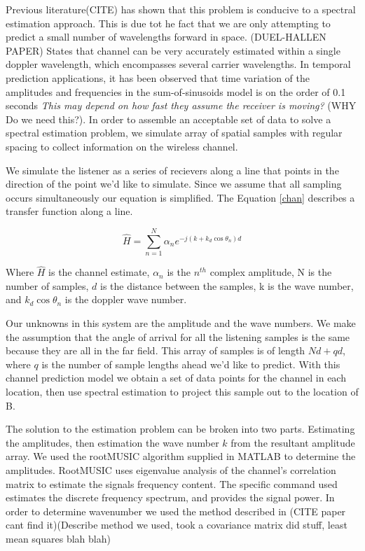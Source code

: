\documentclass{allertonproc}
\begin{document}
Previous literature(CITE) has shown that this problem is conducive to a spectral estimation approach. This is due tot he fact that we are only attempting to predict a small number of wavelengths forward in space. (DUEL-HALLEN PAPER) States that channel can be very accurately estimated within a single doppler wavelength, which encompasses several carrier wavelengths. In temporal prediction applications, it has been observed that time variation of the amplitudes and frequencies in the sum-of-sinusoids model is on the order of 0.1 seconds \cite{duel-hallen2007} \emph{This may depend on how fast they assume the receiver is moving?} (WHY Do we need this?).  In order to assemble an acceptable set of data to solve a spectral estimation problem, we simulate array of spatial samples with regular spacing to collect information on the wireless channel.

We simulate the listener as a series of recievers along a line that points in the direction of the point we'd like to simulate. Since we assume that all sampling occurs simultaneously our equation is simplified. The Equation \ref{chan} describes a transfer function along a line.


\begin{equation}\label{chan}
\hat{H}= \sum_{n=1}^N \alpha_n e^{-j(k+k_d\cos\theta_n)d}
\end{equation}

 Where $\hat{H}$ is the channel estimate, $\alpha_n$ is the $n^{th}$ complex amplitude, N is the number of samples, $d$ is the distance between the samples, k is the wave number, and $k_d\cos\theta_n$ is the doppler wave number. 

Our unknowns in this system are the amplitude and the wave numbers. We make the assumption that the angle of arrival for all the listening samples is the same because they are all in the far field. This array of samples is of length $Nd+qd$, where $q$ is the number of sample lengths ahead we'd like to predict. With this channel prediction model we obtain a set of data points for the channel in each location, then use spectral estimation to project this sample out to the location of B.

The solution to the estimation problem can be broken into two parts. Estimating the amplitudes, then estimation the wave number $k$ from the resultant amplitude array. We used the rootMUSIC algorithm supplied in MATLAB to determine the amplitudes. RootMUSIC uses eigenvalue analysis of the channel's correlation matrix to estimate the signals frequency content. The specific command used estimates the discrete frequency spectrum, and provides the signal power.  In order to determine wavenumber we used the method described in (CITE paper cant find it)(Describe method we used, took a covariance matrix did stuff, least mean squares blah blah) 
\end{document}
